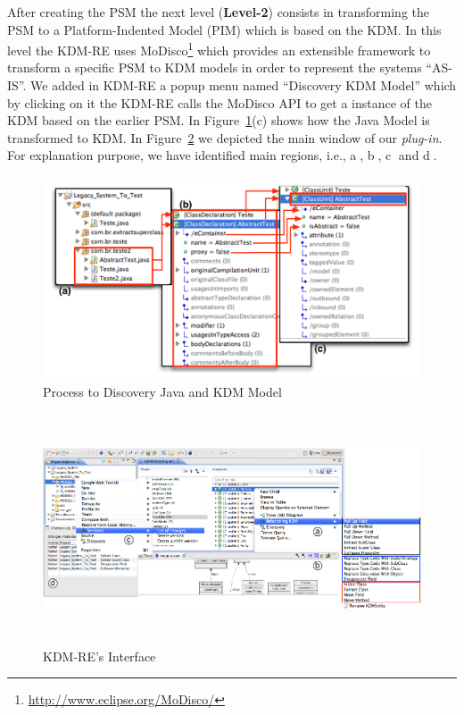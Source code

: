 After creating the PSM the next level (\textbf{Level-2}) consists in transforming the PSM to a Platform-Indented Model (PIM) which is based on the KDM. 
In this level the KDM-RE uses MoDisco\footnote{\url{http://www.eclipse.org/MoDisco/}} which provides an extensible framework to transform a specific PSM to KDM models in order to represent the systems ``AS-IS''. We added in KDM-RE a popup menu named ``Discovery KDM Model'' which by clicking on it the KDM-RE calls the MoDisco API to get a instance of the KDM based on the earlier PSM.
In Figure~\ref{fig:discovery_java_model}(c) shows how the Java Model is transformed to KDM. In Figure~\ref{fig:interface} we depicted the main window of our \textit{plug-in}. 
For explanation purpose, we have identified main regions, i.e., \textcircled{a}, \textcircled{b}, \textcircled{c} and \textcircled{d}.
%
\begin{figure}[!ht]
\centering
  \includegraphics[width=13cm, height=6cm]{figure/GerandoTODOS}
\caption{Process to Discovery Java and KDM Model}
\label{fig:discovery_java_model}
\end{figure}
%


\begin{figure}[!ht]
\centering
  \includegraphics[width=15cm, height=6.8cm]{figure/ScreenShot_tool}
\caption{KDM-RE's Interface}
\label{fig:interface}
\end{figure}

